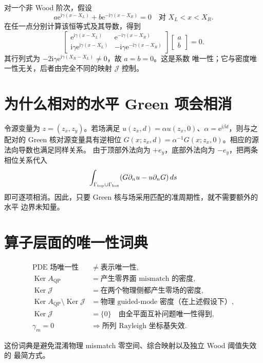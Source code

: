 \documentclass[UTF8,11pt,fontset=fandol]{ctexart}
\newcommand{\ii}{\mathrm i}
\newcommand{\ee}{\mathrm e}
\newcommand{\QP}{\mathrm{QP}}
\newcommand{\Ker}{\operatorname{Ker}}
\theoremstyle{plain}
\theoremstyle{definition}
\theoremstyle{remark}
\begin{document}
对一个非 Wood 阶次，假设
\[
a\ee^{\ii\gamma(x-X_L)}+b\ee^{-\ii\gamma(x-X_R)}=0
\quad\text{对 }X_L<x<X_R.
\]
在任一点分别计算该恒等式及其导数，得到
\[
\begin{bmatrix}
\ee^{\ii\gamma(x-X_L)}&\ee^{-\ii\gamma(x-X_R)}\\
\ii\gamma\ee^{\ii\gamma(x-X_L)}&
-\ii\gamma\ee^{-\ii\gamma(x-X_R)}
\end{bmatrix}
\begin{bmatrix}a\\b\end{bmatrix}=0.
\]
其行列式为
\(-2\ii\gamma\ee^{\ii\gamma(X_R-X_L)}\neq0\)，故 \(a=b=0\)。这是系数
唯一性；它与密度唯一性无关，后者由完全不同的映射 \(\mathcal J\) 控制。

\section{为什么相对的水平 Green 项会相消}

令源变量为 \(z=(z_x,z_y)\)。若场满足
\(u(z_x,d)=\alpha u(z_x,0)\)、\(\alpha=\ee^{\ii\beta d}\)，则与之配对的
Green 核对源变量具有逆相位
\(G(x;z_x,d)=\alpha^{-1}G(x;z_x,0)\)。相应的源法向导数也满足同样关系。
由于顶部外法向为 \(+e_y\)，底部外法向为 \(-e_y\)，把两条相位关系代入
\[
\int_{\Gamma_{\rm top}\cup\Gamma_{\rm bot}}
  (G\partial_n u-u\partial_nG)\,ds
\]
即可逐项相消。因此，只要 Green 核与场采用匹配的准周期性，就不需要额外的水平
边界未知量。

\section{算子层面的唯一性词典}

\begin{align*}
\text{PDE 场唯一性}
&\neq \text{表示唯一性},\\
\Ker A_{\QP}
&=\text{产生零界面 mismatch 的密度},\\
\Ker\mathcal J
&=\text{在两个物理侧都产生零场的密度},\\
\Ker A_{\QP}\setminus\Ker\mathcal J
&=\text{物理 guided-mode 密度（在上述假设下）},\\
\Ker\mathcal J
&=\{0\}\quad\text{由全平面互补问题唯一性得到},\\
\gamma_m=0
&\Rightarrow\text{所列 Rayleigh 坐标基失效}.
\end{align*}

这份词典是避免混淆物理 mismatch 零空间、综合映射以及独立 Wood 阈值失效的
最简方式。
\end{document}
